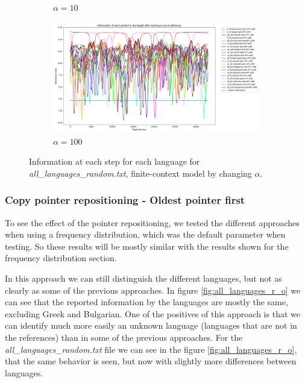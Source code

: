 \documentclass{article}
\begin{document}
\begin{figure}
\begin{subfigure}[b]{0.3\textwidth}
\begin{center}
        \end{center}
        \caption{$\alpha = 10$}
        \label{fig:all_languages_random_p_c:10:3}
    \end{subfigure}
    \hfill
    \begin{subfigure}[b]{0.3\textwidth}
        \begin{center}
            \includegraphics[width=1.0\linewidth]{../results/all_languages_random/-p_c:100:3.png}
        \end{center}
        \caption{$\alpha = 100$}
        \label{fig:all_languages_random_p_c:100:3}
    \end{subfigure}
    
    \caption{Information at each step for each language for \textit{all\_languages\_random.txt}, finite-context model by changing $\alpha$.}
    \label{fig:all_languages_random_p_c:alpha}
\end{figure}

\subsubsection{Copy pointer repositioning - Oldest pointer first}
\label{subsubsec:results_locate_lang_oldest_pointer_first}

To see the effect of the pointer repositioning, we tested the different approaches when using a frequency distribution, which was the default parameter when testing.
So these results will be mostly similar with the results shown for the frequency distribution section.

In this approach we can still distinguish the different languages, but not as clearly as some of the previous approaches.
In figure \ref{fig:all_languages_r_o} we can see that the reported information by the languages are mostly the same, excluding Greek and Bulgarian.
One of the positives of this approach is that we can identify much more easily an unknown language (languages that are not in the references) than in some of the previous approaches. %
For the \textit{all\_languages\_random.txt} file we can see in the figure \ref{fig:all_languages_r_o}, that the same behavior is seen, but now with slightly more differences between languages.
\end{document}
